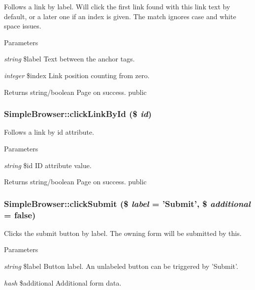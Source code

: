 \label{class_simple_browser_a133bb64ab68f9d973f30be9de9d7120a}
Follows a link by label. Will click the first link found with this link text by default, or a later one if an index is given. The match ignores case and white space issues. 
\begin{DoxyParams}{Parameters}
\item[{\em string}]\$label Text between the anchor tags. \item[{\em integer}]\$index Link position counting from zero. \end{DoxyParams}
\begin{DoxyReturn}{Returns}
string/boolean Page on success.  public 
\end{DoxyReturn}
\hypertarget{class_simple_browser_a4b01802bf87bf267226f41e55a02937f}{
\subsubsection[{clickLinkById}]{\setlength{\rightskip}{0pt plus 5cm}SimpleBrowser::clickLinkById (\$ {\em id})}}
\label{class_simple_browser_a4b01802bf87bf267226f41e55a02937f}
Follows a link by id attribute. 
\begin{DoxyParams}{Parameters}
\item[{\em string}]\$id ID attribute value. \end{DoxyParams}
\begin{DoxyReturn}{Returns}
string/boolean Page on success.  public 
\end{DoxyReturn}
\hypertarget{class_simple_browser_a4b9828b2ffd9a094c61475c355205530}{
\subsubsection[{clickSubmit}]{\setlength{\rightskip}{0pt plus 5cm}SimpleBrowser::clickSubmit (\$ {\em label} = {\ttfamily 'Submit'}, \/  \$ {\em additional} = {\ttfamily false})}}
\label{class_simple_browser_a4b9828b2ffd9a094c61475c355205530}
Clicks the submit button by label. The owning form will be submitted by this. 
\begin{DoxyParams}{Parameters}
\item[{\em string}]\$label Button label. An unlabeled button can be triggered by 'Submit'. \item[{\em hash}]\$additional Additional form data. \end{DoxyParams}
